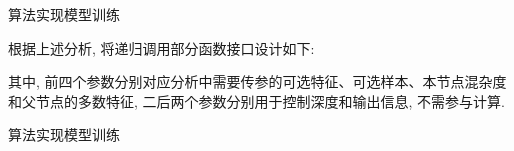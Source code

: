 \begin{frame}{算法实现}{模型训练}

\vspace{-0.2cm}

根据上述分析, 将递归调用部分函数接口设计如下:

\vspace{-0.1cm}

\begin{figure}[bth]
\end{figure}

\vspace{-0.2cm}

\noindent 其中, 前四个参数分别对应分析中需要传参的可选特征、可选样本、本节点混杂度和父节点的多数特征, 二后两个参数分别用于控制深度和输出信息, 不需参与计算.
\end{frame}

\begin{frame}{算法实现}{模型训练}

\vspace{-1.2cm}

\begin{figure}[bth]
\end{figure}

\end{frame}

